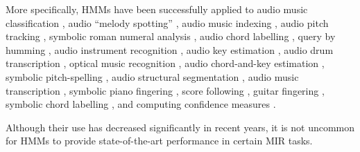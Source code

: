 More specifically, HMMs have been successfully applied to audio music classification \cite{batlle_automatic_2000},
audio ``melody spotting'' \cite{durey_melody_2001, pikrakis_novel_2005},
audio music indexing \cite{jin_indexing_2002},
audio pitch tracking \cite{orio_hmm-based_2003, cazau_improving_2017},
symbolic roman numeral analysis \cite{raphael_functional_2004},
audio chord labelling \cite{sheh_chord_2003, bello_robust_2005, lee_automatic_2006, papadopoulos_large-scale_2007, khadkevich_use_2009,ueda_hmm-based_2010, chen_chord_2012},
query by humming \cite{shifrin_effectiveness_2003, jang_continuous_2005},
audio instrument recognition \cite{eichner_instrument_2006},
audio key estimation \cite{noland_key_2006, peeters_chroma-based_2006},
audio drum transcription \cite{paulus_acoustic_2006, paulus_combining_2007},
optical music recognition \cite{pugin_optical_2006, pugin_map_2007},
audio chord-and-key estimation \cite{catteau_probabilistic_2007, lee_unified_2007},
symbolic pitch-spelling \cite{teodoru_pitch_2007},
audio structural segmentation \cite{paulus_state_2010},
audio music transcription \cite{benetos_explicit_2013,jancovic_automatic_2015, cazau_improving_2017},
symbolic piano fingering \cite{nakamura_merged-output_2014},
score following \cite{nakamura_autoregressive_2015},
guitar fingering \cite{hori_minimax_2016},
symbolic chord labelling \cite{masada_chord_2017},
and computing confidence measures \cite{pauwels_confidence_2017}.

Although their use has decreased significantly in recent years, it is not uncommon for HMMs to provide state-of-the-art performance in certain MIR tasks.




